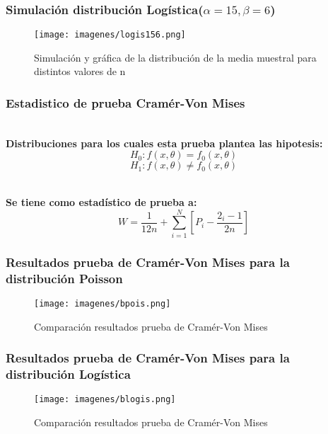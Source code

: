 \documentclass[12pt]{beamer}
\begin{document}
\begin{frame}
\frametitle{Simulación distribución Logística($\alpha=15,\beta=6$) }
\begin{figure}
\centering
\texttt{[image: imagenes/logis156.png]}
\caption{Simulación y gráfica de la distribución de la media muestral para distintos valores de n}\label{figura2}
\end{figure}
\end{frame}


\begin{frame}
\frametitle{Estadistico de prueba Cramér-Von Mises}
~\\ \textbf{Distribuciones para los cuales esta prueba plantea las hipotesis:}
$$H_{0}:f(x,\theta)=f_{0}(x,\theta)$$
$$H_{1}:f(x,\theta)\neq f_{0}(x,\theta) $$ 

~\\ \textbf{Se tiene como estadístico de prueba a:}
$$ W = \frac{1}{12n} + \displaystyle\sum_{i=1}^N [P_i - \frac{2_i - 1 }{2n}] $$
\end{frame}

\begin{frame}
\frametitle{Resultados prueba de Cramér-Von Mises para la distribución Poisson}
\begin{figure}
\centering
\texttt{[image: imagenes/bpois.png]}
\caption{Comparación resultados prueba de Cramér-Von Mises}\label{figura2}
\end{figure}
\end{frame}

\begin{frame}
\frametitle{Resultados prueba de Cramér-Von Mises para la distribución Logística}
\begin{figure}
\centering
\texttt{[image: imagenes/blogis.png]}
\caption{Comparación resultados prueba de Cramér-Von Mises}\label{figura2}
\end{figure}
\end{frame}
\end{document}
